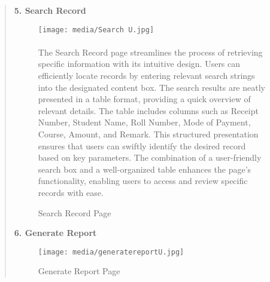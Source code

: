 \documentclass[12pt]{report}
\begin{document}
\begin{quote}
		\textbf{5. Search Record}
		\begin{figure}[h]
			\centering
			\texttt{[image: media/Search U.jpg]}\\
			\caption{Search Record Page}
			\vspace{0.5cm}
			\paragraph{}
			\justifying
			The Search Record page streamlines the process of retrieving specific information with its intuitive design. Users can efficiently locate records by entering relevant search strings into the designated content box. The search results are neatly presented in a table format, providing a quick overview of relevant details. The table includes columns such as Receipt Number, Student Name, Roll Number, Mode of Payment, Course, Amount, and Remark. This structured presentation ensures that users can swiftly identify the desired record based on key parameters. The combination of a user-friendly search box and a well-organized table enhances the page's functionality, enabling users to access and review specific records with ease.
		\end{figure}
		\clearpage
		\textbf{6. Generate Report}
		\begin{figure}[h]
			\centering
			\texttt{[image: media/generatereportU.jpg]}\\
			\caption{Generate Report Page}
			\vspace{0.5cm}

\end{figure}
\end{quote}
\end{document}

